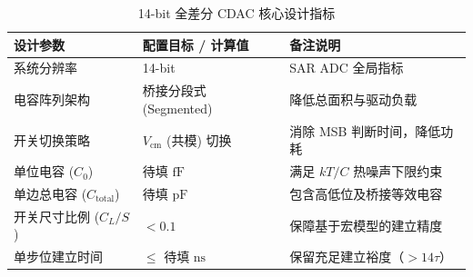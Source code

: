 \begin{table}[H]
\centering
\caption{14-bit 全差分 CDAC 核心设计指标}
\label{tab:cdac_final_specs}
\begin{tabular}{lll}
\toprule
\textbf{设计参数} & \textbf{配置目标 / 计算值} & \textbf{备注说明} \\
\midrule
系统分辨率 & 14-bit & SAR ADC 全局指标 \\
电容阵列架构 & 桥接分段式 (Segmented) & 降低总面积与驱动负载 \\
开关切换策略 & $V_{\mathrm{cm}}$ (共模) 切换 & 消除 MSB 判断时间，降低功耗 \\
单位电容 ($C_0$) & 待填 $\mathrm{fF}$ & 满足 $kT/C$ 热噪声下限约束 \\
单边总电容 ($C_{\mathrm{total}}$) & 待填 $\mathrm{pF}$ & 包含高低位及桥接等效电容 \\
开关尺寸比例 ($C_L/S$) & $< 0.1$ & 保障基于宏模型的建立精度 \\
单步位建立时间 & $\le$ 待填 $\mathrm{ns}$ & 保留充足建立裕度（$>14\tau$） \\
\bottomrule
\end{tabular}
\end{table}



